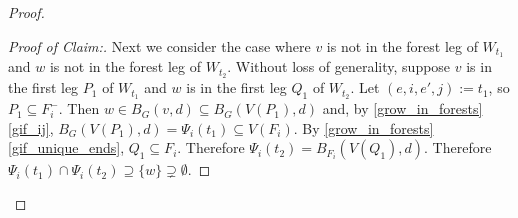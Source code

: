 \documentclass{patmorin}
\newenvironment{clmproof}{\begin{proof}[Proof of Claim:]\renewcommand{\qedsymbol}{\rule{1ex}{1ex}}}{\end{proof}}
\begin{document}
\begin{proof}
\begin{clmproof}
  Next we consider the case where $v$ is not in the forest leg of $W_{t_1}$ and $w$ is not in the forest leg of $W_{t_2}$.  Without loss of generality, suppose $v$ is in the first leg $P_1$ of $W_{t_1}$ and $w$ is in the first leg $Q_1$ of $W_{t_2}$.  Let $(e,i,e',j):=t_1$, so $P_1\subseteq F_i^-$. Then $w\in B_G(v,d)\subseteq B_G(V(P_1),d)$ and, by \cref{grow_in_forests}\cref{gif_ij}, $B_G(V(P_1),d)=\Psi_i(t_1)\subseteq V(F_i)$.  By \cref{grow_in_forests}\cref{gif_unique_ends}, $Q_1\subseteq F_i$.  Therefore $\Psi_i(t_2)=B_{F_i}(V(Q_1),d)$.  Therefore $\Psi_i(t_1)\cap\Psi_i(t_2)\supseteq\{w\}\supsetneq \emptyset$. \qedhere

\end{clmproof}
\end{proof}
\end{document}
